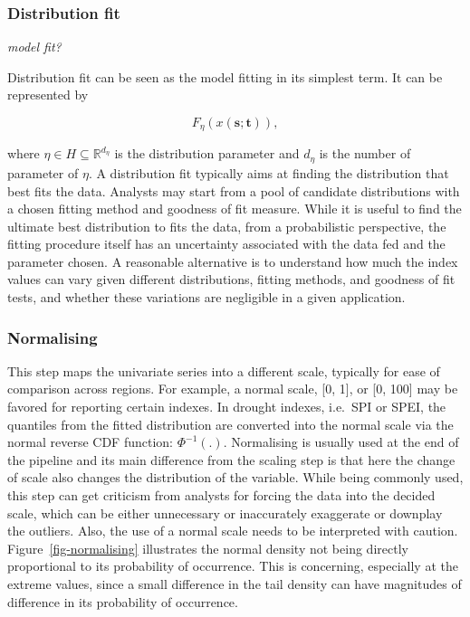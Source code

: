 \documentclass[
]{article}
\begin{document}
\hypertarget{distribution-fit}{%
\subsubsection{Distribution fit}\label{distribution-fit}}

\emph{model fit? }

Distribution fit can be seen as the model fitting in its simplest term.
It can be represented by

\begin{equation}
F_{\eta}(x(\mathbf{s}; \mathbf{t})), 
\end{equation}

where \(\eta \in H \subseteq \mathbb{R}^{d_{\eta}}\) is the distribution
parameter and \(d_{\eta}\) is the number of parameter of \(\eta\). A
distribution fit typically aims at finding the distribution that best
fits the data. Analysts may start from a pool of candidate distributions
with a chosen fitting method and goodness of fit measure. While it is
useful to find the ultimate best distribution to fits the data, from a
probabilistic perspective, the fitting procedure itself has an
uncertainty associated with the data fed and the parameter chosen. A
reasonable alternative is to understand how much the index values can
vary given different distributions, fitting methods, and goodness of fit
tests, and whether these variations are negligible in a given
application.

\hypertarget{normalising}{%
\subsubsection{Normalising}\label{normalising}}

This step maps the univariate series into a different scale, typically
for ease of comparison across regions. For example, a normal scale,
{[}0, 1{]}, or {[}0, 100{]} may be favored for reporting certain
indexes. In drought indexes, i.e.~SPI or SPEI, the quantiles from the
fitted distribution are converted into the normal scale via the normal
reverse CDF function: \(\Phi^{-1}(.)\). Normalising is usually used at
the end of the pipeline and its main difference from the scaling step is
that here the change of scale also changes the distribution of the
variable. While being commonly used, this step can get criticism from
analysts for forcing the data into the decided scale, which can be
either unnecessary or inaccurately exaggerate or downplay the outliers.
Also, the use of a normal scale needs to be interpreted with caution.
Figure~\ref{fig-normalising} illustrates the normal density not being
directly proportional to its probability of occurrence. This is
concerning, especially at the extreme values, since a small difference
in the tail density can have magnitudes of difference in its probability
of occurrence.
\end{document}
